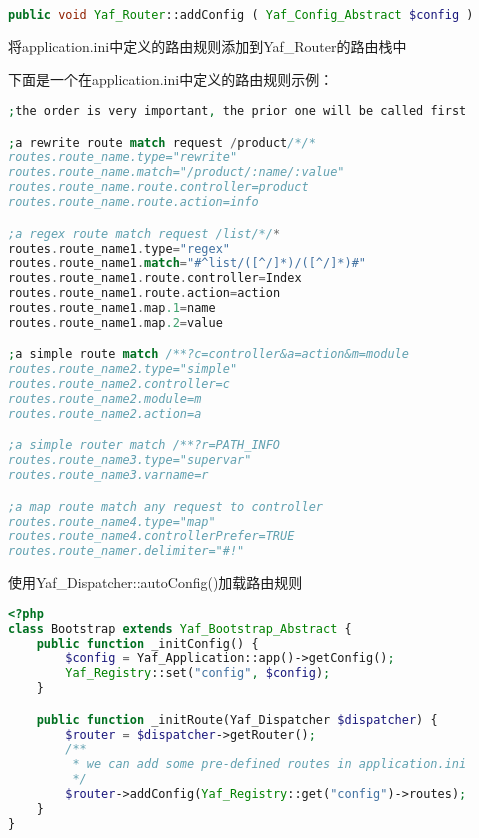 \begin{lstlisting}[language=PHP]
public void Yaf_Router::addConfig ( Yaf_Config_Abstract $config )
\end{lstlisting}

将application.ini中定义的路由规则添加到Yaf\_Router的路由栈中

下面是一个在application.ini中定义的路由规则示例：


\begin{lstlisting}[language=PHP]
;the order is very important, the prior one will be called first

;a rewrite route match request /product/*/*
routes.route_name.type="rewrite"
routes.route_name.match="/product/:name/:value"
routes.route_name.route.controller=product
routes.route_name.route.action=info

;a regex route match request /list/*/*
routes.route_name1.type="regex"
routes.route_name1.match="#^list/([^/]*)/([^/]*)#"
routes.route_name1.route.controller=Index
routes.route_name1.route.action=action
routes.route_name1.map.1=name
routes.route_name1.map.2=value

;a simple route match /**?c=controller&a=action&m=module
routes.route_name2.type="simple"
routes.route_name2.controller=c
routes.route_name2.module=m
routes.route_name2.action=a

;a simple router match /**?r=PATH_INFO
routes.route_name3.type="supervar"
routes.route_name3.varname=r

;a map route match any request to controller
routes.route_name4.type="map"
routes.route_name4.controllerPrefer=TRUE
routes.route_namer.delimiter="#!"
\end{lstlisting}

\begin{example}
使用Yaf\_Dispatcher::autoConfig()加载路由规则
\begin{lstlisting}[language=PHP]
<?php
class Bootstrap extends Yaf_Bootstrap_Abstract {
    public function _initConfig() {
        $config = Yaf_Application::app()->getConfig();
        Yaf_Registry::set("config", $config);
    }

    public function _initRoute(Yaf_Dispatcher $dispatcher) {
        $router = $dispatcher->getRouter();
        /**
         * we can add some pre-defined routes in application.ini
         */
        $router->addConfig(Yaf_Registry::get("config")->routes);
    }
}
\end{lstlisting}
\end{example}




